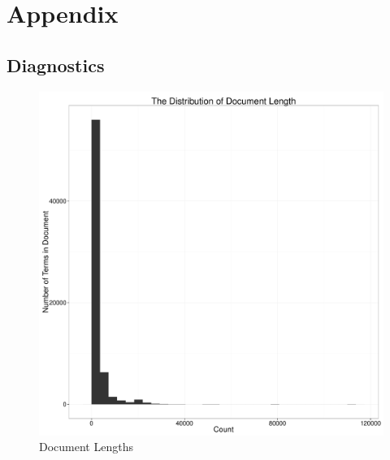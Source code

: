 \documentclass[11pt,article,oneside]{memoir}
\makeatletter
\def\maxwidth{\ifdim\Gin@nat@width>\linewidth\linewidth
\else\Gin@nat@width\fi}
\let\Oldincludegraphics\includegraphics
\renewcommand{\includegraphics}[1]{\Oldincludegraphics[width=\maxwidth]{#1}}
\makeatother
\begin{document}
\pagebreak

\section{Appendix}\label{appendix}

\subsection{Diagnostics}\label{diagnostics}

\begin{figure}[htbp]
\centering
\includegraphics{figure/Document-Lengths.pdf}
\caption{Document Lengths}
\end{figure}
\end{document}
